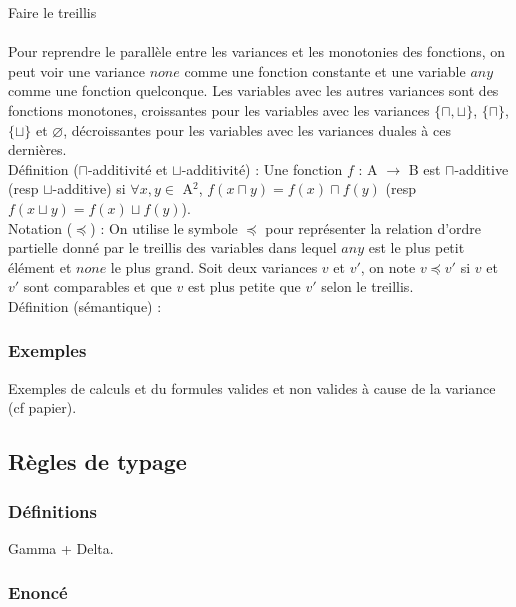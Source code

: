 \documentclass[11pt,a4paper]{article}
\begin{document}
Faire le treillis
\\\\

\color{red}
Pour reprendre le parallèle entre les variances et les monotonies des fonctions, on peut voir une variance $none$ comme une fonction constante et une variable $any$ comme une fonction quelconque. Les variables avec les autres variances sont des fonctions monotones, croissantes pour les variables avec les variances $\{\sqcap, \sqcup\}$, $\{\sqcap\}$, $\{\sqcup\}$ et $\varnothing$, décroissantes pour les variables avec les variances duales à ces dernières. 
\\

Définition ($\sqcap$-additivité et $\sqcup$-additivité) : Une fonction $f$ : A $\rightarrow$ B est $\sqcap$-additive (resp $\sqcup$-additive) si $\forall x, y \in$ A$^2$, $f(x \sqcap y) = f(x) \sqcap f(y)$ (resp $f(x \sqcup y) = f(x) \sqcup f(y)$).
\\

Notation ($\preccurlyeq$) : On utilise le symbole $\preccurlyeq$ pour représenter la relation d'ordre partielle donné par le treillis des variables dans lequel $any$ est le plus petit élément et $none$ le plus grand. Soit deux variances $v$ et $v'$, on note $v \preccurlyeq v'$ si $v$ et $v'$ sont comparables et que $v$ est plus petite que $v'$ selon le treillis. 
\\

Définition (sémantique) : 



\color{black}



\subsubsection{Exemples}

Exemples de calculs et du formules valides et non valides à cause de la variance (cf papier).

\subsection{Règles de typage}

\subsubsection{Définitions}

Gamma + Delta.

\subsubsection{Enoncé}
\end{document}
